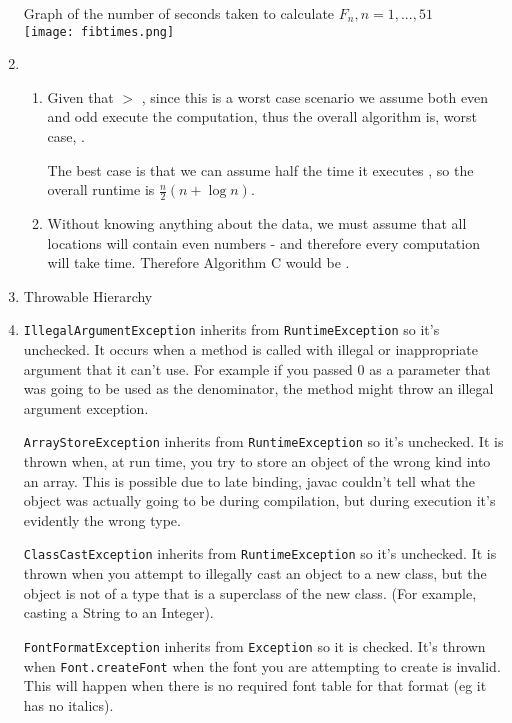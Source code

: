 \documentclass[12pt]{chmullighw}
\begin{document}
\begin{enumerate}
Graph of the number of seconds taken to calculate $F_n, n=1,...,51$ \\
\texttt{[image: fibtimes.png]}


\item
    \begin{enumerate}
    \item  Given that  $>$ , since this is a worst case scenario
we assume both even and odd execute the  computation, thus the overall
algorithm is, worst case, .

    The best case is that we can assume half the time it executes ,
    so the overall runtime is $\frac{n}{2}(n + \log n)$.
    \item Without knowing anything about the data, we must assume that all locations
    will contain even numbers - and therefore every computation will take  time. Therefore
    Algorithm C would be .
    \end{enumerate}



\item Throwable Hierarchy



\item 
\texttt{IllegalArgumentException} inherits from \texttt{RuntimeException} so it's unchecked. It occurs when a method is called with illegal or inappropriate argument that it can't use. For example if you passed 0 as a parameter that was going to be used as the denominator, the method might throw an illegal argument exception.

\texttt{ArrayStoreException} inherits from \texttt{RuntimeException} so it's unchecked. It is thrown when, at run time, you try to store an object of the wrong kind into an array. This is possible due to late binding, javac couldn't tell what the object was actually going to be during compilation, but during execution it's evidently the wrong type.

\texttt{ClassCastException} inherits from \texttt{RuntimeException} so it's unchecked. It is thrown when you attempt to illegally cast an object to a new class, but the object is not of a type that is a superclass of the new class. (For example, casting a String to an Integer). 

\texttt{FontFormatException} inherits from \texttt{Exception} so it is checked. It's thrown when \texttt{Font.createFont} when the font you are attempting to create is invalid. This will happen when there is no required font table for that format (eg it has no italics).


\end{enumerate}
\end{document}
